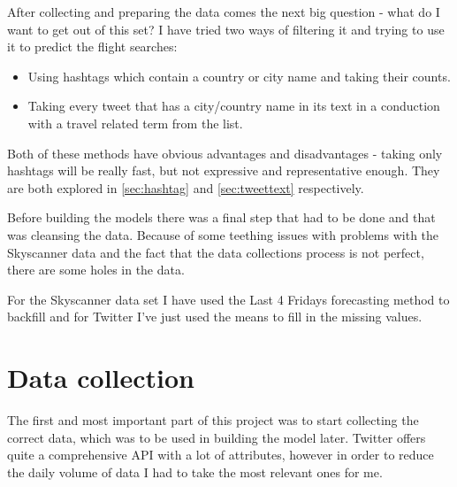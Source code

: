 \documentclass[minf,frontabs,twoside,singlespacing,parskip]{infthesis}
\begin{document}
After collecting and preparing the data comes the next big question - what do I want to get out of this set? I have tried two ways of filtering it and trying to use it to predict the flight searches:
\begin{itemize}
\item Using hashtags which contain a country or city name and taking their counts.
\item Taking every tweet that has a city/country name in its text in a conduction with a travel related term from the list. 
\end{itemize}

Both of these methods have obvious advantages and disadvantages - taking only hashtags will be really fast, but not expressive and representative enough. They are both explored in  \ref{sec:hashtag} and \ref{sec:tweettext} respectively. 


Before building the models there was a final step that had to be done and that was cleansing the data. Because of some teething issues with problems with the Skyscanner data and the fact that the data collections process is not perfect, there are some holes in the data. 


For the Skyscanner data set I have used the Last 4 Fridays forecasting method to backfill and for Twitter I've just used the means to fill in the missing values. 

\section{Data collection}
\label{sec:dc}

The first and most important part of this project was to start collecting the correct data, which was to be used in building the model later. Twitter offers quite a comprehensive API with a lot of attributes, however in order to reduce the daily volume of data I had to take the most relevant ones for me. 
\end{document}
